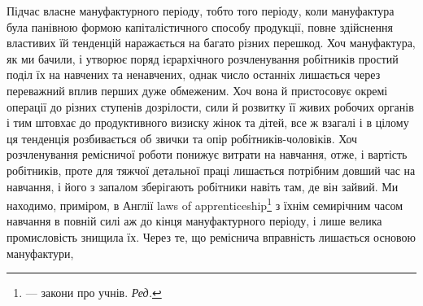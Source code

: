 Підчас власне мануфактурного періоду, тобто того періоду,
коли мануфактура була панівною формою капіталістичного способу
продукції, повне здійснення властивих їй тенденцій наражається
на багато різних перешкод. Хоч мануфактура, як ми
бачили, і утворює поряд ієрархічного розчленування робітників
простий поділ їх на навчених та ненавчених, однак число останніх
лишається через переважний вплив перших дуже обмеженим.
Хоч вона й пристосовує окремі операції до різних ступенів дозрілости,
сили й розвитку її живих робочих органів і тим штовхає
до продуктивного визиску жінок та дітей, все ж взагалі і в цілому
ця тенденція розбивається об звички та опір робітників-чоловіків.
Хоч розчленування ремісничої роботи понижує витрати на
навчання, отже, і вартість робітників, проте для тяжчої детальної
праці лишається потрібним довший час на навчання, і його
з запалом зберігають робітники навіть там, де він зайвий. Ми
находимо, приміром, в Англії laws of apprenticeship\footnote*{
— закони про учнів. \emph{Ред.}
} з їхнім
семирічним часом навчання в повній силі аж до кінця мануфактурного
періоду, і лише велика промисловість знищила їх. Через
те, що реміснича вправність лишається основою мануфактури,
\parbreak{}  %
